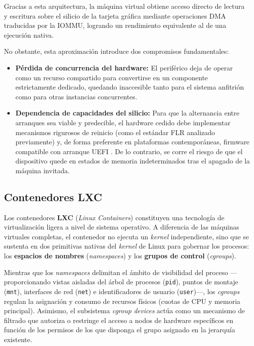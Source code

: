Gracias a esta arquitectura, la máquina virtual obtiene acceso directo de lectura y escritura sobre el silicio de la tarjeta gráfica mediante operaciones DMA traducidas por la IOMMU, logrando un rendimiento equivalente al de una ejecución nativa.

No obstante, esta aproximación introduce dos compromisos fundamentales:
\begin{itemize}
    \item \textbf{Pérdida de concurrencia del hardware:} El periférico deja de operar como un recurso compartido para convertirse en un componente estrictamente dedicado, quedando inaccesible tanto para el sistema anfitrión como para otras instancias concurrentes.
    \item \textbf{Dependencia de capacidades del silicio:} Para que la alternancia entre arranques sea viable y predecible, el hardware cedido debe implementar mecanismos rigurosos de reinicio (como el estándar FLR analizado previamente) y, de forma preferente en plataformas contemporáneas, firmware compatible con arranque UEFI \cite{pcisig2022,amd_pg344_flr,uefi_gop_amd}. De lo contrario, se corre el riesgo de que el dispositivo quede en estados de memoria indeterminados tras el apagado de la máquina invitada.
\end{itemize}

\subsection{Contenedores LXC}

Los contenedores \textbf{LXC} (\textit{Linux Containers}) constituyen una tecnología de virtualización ligera a nivel de sistema
operativo. A diferencia de las máquinas virtuales completas, el contenedor no ejecuta un \textit{kernel} independiente, sino que se 
sustenta en dos primitivas nativas del \textit{kernel} de Linux para gobernar los procesos: los \textbf{espacios de nombres} 
(\textit{namespaces}) y los \textbf{grupos de control} (\textit{cgroups}).

Mientras que los \textit{namespaces} delimitan el ámbito de visibilidad del proceso —proporcionando vistas aisladas del árbol 
de procesos (\texttt{pid}), puntos de montaje (\texttt{mnt}), interfaces de red (\texttt{net}) e identificadores de usuario 
(\texttt{user})—, los \textit{cgroups} regulan la asignación y consumo de recursos físicos (cuotas de CPU y memoria principal). 
Asimismo, el subsistema \textit{cgroup devices} actúa como un mecanismo de filtrado que autoriza o restringe el acceso a nodos 
de hardware específicos en función de los permisos de los que disponga el grupo asignado en la jerarquía existente.

